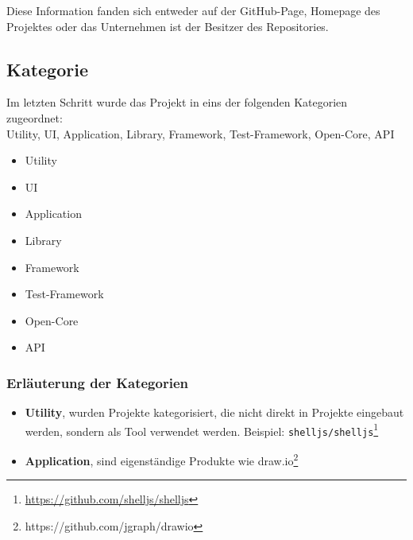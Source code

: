 \noindent
Diese Information fanden sich entweder auf der GitHub-Page, Homepage des Projektes oder das Unternehmen
ist der Besitzer des Repositories.



\subsection{Kategorie}
Im letzten Schritt wurde das Projekt in eins der folgenden Kategorien zugeordnet: \\
Utility, UI, Application, Library, Framework, Test-Framework, Open-Core, API

\begin{multicols}{2}
    \begin{itemize}
        \setlength\itemsep{0em}
        \item Utility
        \item UI
        \item Application
        \item Library
        \item Framework
        \item Test-Framework
        \item Open-Core
        \item API
    \end{itemize}
\end{multicols}

\subsubsection*{Erläuterung der Kategorien}

\begin{itemize}
    \setlength\itemsep{0em}
    \item \textbf{Utility}, wurden Projekte kategorisiert, die nicht direkt in Projekte eingebaut
          werden, sondern als Tool verwendet werden. Beispiel: \texttt{shelljs/shelljs}\footnote{
              \url{https://github.com/shelljs/shelljs}}
    \item \textbf{Application}, sind eigenständige Produkte wie draw.io\footnote{
              https://github.com/jgraph/drawio}
\end{itemize}





\newpage %
